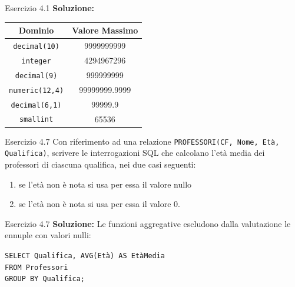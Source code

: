 \begin{frame}{Esercizio 4.1}
    \textbf{Soluzione:}
    \begin{table}[h]
        \centering
        \begin{tabular}{|c|c|}
            \hline
            Dominio & Valore Massimo \\
            \hline
            \texttt{decimal(10)} & 9999999999 \\
            \texttt{integer} & 4294967296 \\
            \texttt{decimal(9)} & 999999999 \\
            \texttt{numeric(12,4)} & 99999999.9999 \\
            \texttt{decimal(6,1)} & 99999.9 \\
            \texttt{smallint} & 65536 \\
            \hline
        \end{tabular}
    \end{table}
\end{frame}
\begin{frame}{Esercizio 4.7}
    Con riferimento ad una relazione \texttt{PROFESSORI(CF, Nome, Et\`a, Qualifica)}, scrivere le interrogazioni SQL che calcolano l'et\`a media dei professori di ciascuna qualifica, nei due casi seguenti:
    \begin{enumerate}
        \item se l'et\`a non \`e nota si usa per essa il valore nullo
        \item se l'et\`a non \`e nota si usa per essa il valore 0.
    \end{enumerate}
\end{frame}

\begin{frame}{Esercizio 4.7}
    \textbf{Soluzione:}
    Le funzioni aggregative escludono dalla valutazione le ennuple con valori nulli:
    \vspace{1em}
    
    \texttt{SELECT Qualifica, AVG(Et\`a) AS Et\`aMedia\\FROM Professori\\GROUP BY Qualifica;}
\end{frame}

